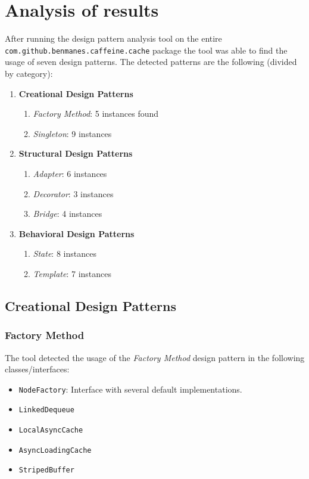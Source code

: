 \section{Analysis of results}

After running the design pattern analysis tool on the entire \texttt{com.github.benmanes.caffeine.cache} package the tool was able to find the usage of seven design patterns. The detected patterns are the following (divided by category):

\begin{enumerate}
  \item \textbf{Creational Design Patterns}
  \begin{enumerate}
    \item \textit{Factory Method}: 5 instances found
    \item \textit{Singleton}: 9 instances
  \end{enumerate}
  \item \textbf{Structural Design Patterns}
  \begin{enumerate}
    \item \textit{Adapter}: 6 instances
    \item \textit{Decorator}: 3 instances
    \item \textit{Bridge}: 4 instances
  \end{enumerate}
  \item \textbf{Behavioral Design Patterns}
  \begin{enumerate}
    \item \textit{State}: 8 instances
    \item \textit{Template}: 7 instances
  \end{enumerate}
\end{enumerate}

\subsection{Creational Design Patterns}

\subsubsection{Factory Method}

The tool detected the usage of the \textit{Factory Method} design pattern in the following classes/interfaces:

\begin{itemize}
  \item \texttt{NodeFactory}: Interface with several default implementations. 
  \item \texttt{LinkedDequeue}
  \item \texttt{LocalAsyncCache}
  \item \texttt{AsyncLoadingCache}
  \item \texttt{StripedBuffer}
\end{itemize}

